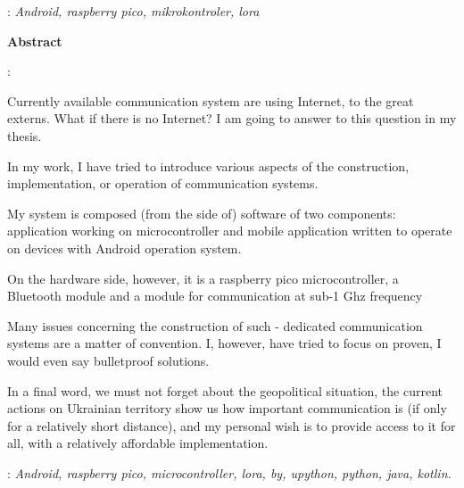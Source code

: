     : {\itshape Android, raspberry pico, mikrokontroler, lora}
    \par 
   \cleardoublepage
    \begin{center}{\large\bfseries Abstract}\par\bigskip\end{center}
    : \tytulen
    \par
    \vspace*{1\baselineskip}
    {
    Currently available communication system are using Internet, to the great externs. What if there is no Internet?
    I am going to answer to this question in my thesis.

	In my work, I have tried to introduce various aspects of the construction, implementation, or operation of communication systems.

	My system is composed (from the side of) software of two components: application working on microcontroller and mobile application written to operate on devices with Android operation system.

	On the hardware side, however, it is a raspberry pico microcontroller, a Bluetooth module and a module for communication at sub-1 Ghz frequency

	Many issues concerning the construction of such - dedicated communication systems are a matter of convention. I, however, have tried to focus on proven, I would even say bulletproof solutions.

	In a final word, we must not forget about the geopolitical situation, the current actions on Ukrainian territory show us how important communication is (if only for a relatively short distance), and my personal wish is to provide access to it for all, with a relatively affordable implementation.
    }
    \vspace*{1\baselineskip}

    : {\itshape Android, raspberry pico, microcontroller, lora, by, upython, python, java, kotlin.}
    
    

    \newpage